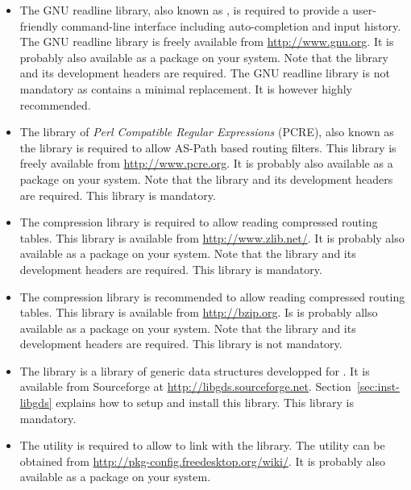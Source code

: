 \begin{itemize}
\item The GNU readline library, also known as
  , is required to provide a user-friendly
  command-line interface including auto-completion and input
  history. The GNU readline library is freely available from
  \url{http://www.gnu.org}. It is probably also available as a package
  on your system. Note that the library and its development
  headers are required. The GNU readline library is not mandatory as
   contains a minimal replacement. It is however
  highly recommended.

\item The library of {\it Perl Compatible Regular Expressions} (PCRE),
  also known as the  library is required to allow
  AS-Path based routing filters. This library is freely available from
  \url{http://www.pcre.org}. It is probably also available as a
  package on your system. Note that the library and its development
  headers are required. This library is mandatory.

\item The  compression library is required to allow
  reading compressed routing tables. This library is available from
  \url{http://www.zlib.net/}. It is probably also available as a
  package on your system. Note that the library and its development
  headers are required. This library is mandatory.

\item The  compression library is recommended to
  allow reading compressed routing tables. This library is available
  from \url{http://bzip.org}. Is is probably allso available as a
  package on your system. Note that the library and its development
  headers are required. This library is not mandatory.

\item The  library is a library of generic data
  structures developped for . It is available from
  Sourceforge at
  \url{http://libgds.sourceforge.net}. Section~\ref{sec:inst-libgds}
  explains how to setup and install this library. This library is
  mandatory.

\item The  utility is required to allow
   to link with the 
  library. The  utility can be obtained from
  \url{http://pkg-config.freedesktop.org/wiki/}. It is probably also
  available as a package on your system.

\end{itemize}

